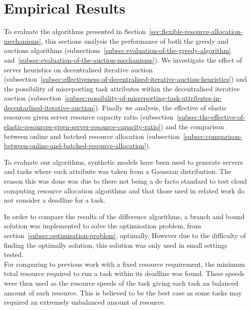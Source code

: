 \section{Empirical Results}
\label{sec:empirical-results}
To evaluate the algorithms presented in Section~\ref{sec:flexible-resource-allocation-mechanisms},
this sections analysis the performance of both the greedy and auctions algorithms
(subsections~\ref{subsec:evaluation-of-the-greedy-algorithm} and~\ref{subsec:evaluation-of-the-auction-mechanisms}).
We investigate the effect of server heuristics on decentralised iterative auction
(subsection~\ref{subsec:effectiveness-of-decentralised-iterative-auction-heuristics}) and
the possibility of misreporting task attributes within the decentralised iterative auction
(subsection~\ref{subsec:possibility-of-misreporting-task-attributes-in-decentarlised-iterative-auction}).
Finally we analysis, the effective of elastic resources given server resource capacity ratio
(subsection~\ref{subsec:the-effective-of-elastic-resources-given-server-resource-capacity-ratio})
and the comparison between online and batched resource allocation
(subsection~\ref{subsec:comparison-between-online-and-batched-resource-allocation}).

To evaluate our algorithms, synthetic models have been used to generate servers and tasks where
each attribute was taken from a Gaussian distribution. The reason this was done was due to there not
being a de facto standard to test cloud computing resource allocation algorithms and that those used
in related work do not consider a deadline for a task.

In order to compare the results of the difference algorithms, a branch and bound solution was implemented to solve
the optimisation problem, from section~\ref{subsec:optimisation-problem}, optimally. However due to the difficulty of
finding the optimally solution, this solution was only used in small settings tested. \\
For comparing to previous work with a fixed resource requirement, the minimum total resource required to run a task
within its deadline was found. These speeds were then used as the resource speeds of the task giving each task an
balanced amount of each resource. This is believed to be the best case as some tasks may required an extremely
unbalanced amount of resource.

